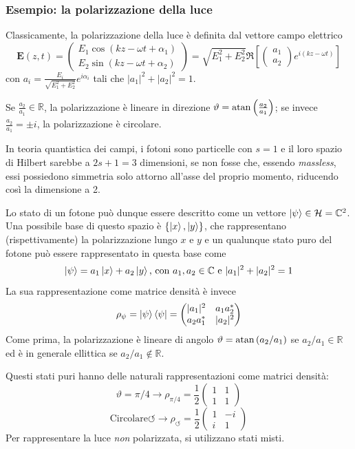 \subsubsection{Esempio: la polarizzazione della luce}
Classicamente, la polarizzazione della luce è definita dal vettore campo elettrico
$$\mathbf{E}(z,t) = 
\begin{pmatrix}
    E_1\cos(kz-\omega t+\alpha_1)\\
    E_2\sin(kz-\omega t +\alpha_2)
\end{pmatrix} = \sqrt{E_1^2+E_2^2}\Re\left[
\begin{pmatrix}
    a_1\\
    a_2
\end{pmatrix}
e^{i(kz-\omega t)}
\right] $$
con $a_i = \frac{E_i}{\sqrt{E_1^2+E_2^2}}e^{i\alpha_i}$ tali che $|a_1|^2+|a_2|^2 = 1$.

Se $\frac{a_2}{a_1}\in\mathbb{R}$, la polarizzazione è lineare in direzione
$\vartheta=\atan\left(\frac{a_2}{a_1}\right)$; se invece $\frac{a_2}{a_1} = \pm i$, la polarizzazione è
circolare.

In teoria quantistica dei campi, i fotoni sono particelle con $s=1$ e il loro spazio di Hilbert sarebbe
a $2s+1=3$ dimensioni, se non fosse che, essendo \textit{massless}, essi possiedono simmetria solo attorno
all'asse del proprio momento, riducendo così la dimensione a 2.

Lo stato di un fotone può dunque essere descritto come un vettore $\ket{\psi}\in\mathcal{H}=\mathbb{C}^2$.
Una possibile base di questo spazio è $\left\{\ket{x},\ket{y}\right\}$, che rappresentano
(rispettivamente) la polarizzazione lungo $x$ e $y$ e un qualunque stato puro del fotone può essere
rappresentato in questa base come
$$\ket{\psi}=a_1\ket{x}+a_2\ket{y}\text{, con }a_1,a_2\in\mathbb{C}\text{ e }|a_1|^2+|a_2|^2=1$$
La sua rappresentazione come matrice densità è invece
$$\rho_\psi = \ket{\psi}\bra{\psi} = 
\begin{pmatrix}
    |a_1|^2 & a_1a_2^*\\
    a_2a_1^*&|a_2|^2
\end{pmatrix}
$$
Come prima, la polarizzazione è lineare di angolo $\vartheta=\atan\left(a_2/a_1\right)$ se
$a_2/a_1\in\mathbb{R}$ ed è in generale ellittica se $a_2/a_1 \notin\mathbb{R}$.

Questi stati puri hanno delle naturali rappresentazioni come matrici densità:
$$\vartheta = \pi/4 \rightarrow\rho_{\pi/4} = \frac{1}{2}
\begin{pmatrix}
    1&1\\
    1&1
\end{pmatrix}
$$
$$
\text{Circolare}\circlearrowleft \rightarrow \rho_\circlearrowleft = \frac{1}{2}
\begin{pmatrix}
    1&-i\\
    i&1
\end{pmatrix}
$$
Per rappresentare la luce \textit{non} polarizzata, si utilizzano stati misti.

